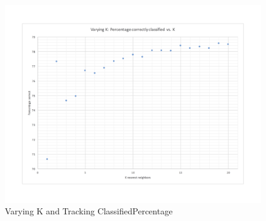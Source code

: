 \documentclass{article}
\begin{document}
\begin{figure}[!htbp]
\begin{center}
\includegraphics[width=1.0\textwidth]{varyingkKNN} %
\caption{Varying K and Tracking ClassifiedPercentage}
\end{center}
\end{figure}
\end{document}
